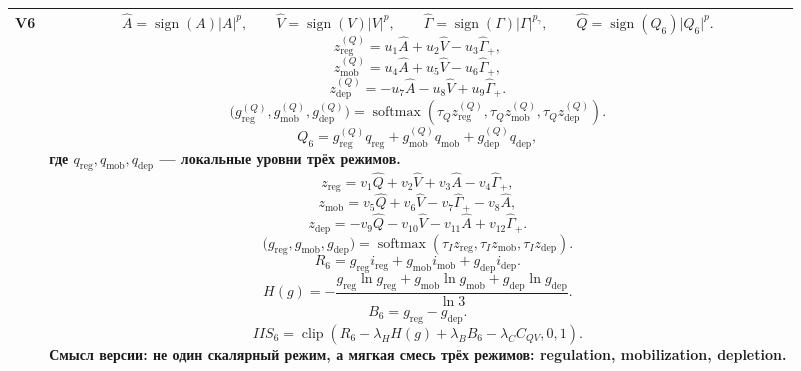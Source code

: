 \documentclass[12pt,a4paper]{article}
\newcommand{\sgn}{\operatorname{sign}}
\newcommand{\clip}{\operatorname{clip}}
\newcommand{\softmax}{\operatorname{softmax}}
\newcommand{\spow}[2]{\sgn(#1)\lvert #1 \rvert^{#2}}
\begin{document}
\begin{landscape}
\begin{longtable}{>{\raggedright\arraybackslash}p{1.6cm} >{\raggedright\arraybackslash}p{16.7cm}}
\textbf{V6} &
\[
\widehat{A}=\spow{A}{p}, \qquad
\widehat{V}=\spow{V}{p}, \qquad
\widehat{\Gamma}=\spow{\Gamma}{p_\gamma}, \qquad
\widehat{Q}=\spow{Q_6}{p}.
\]
\[
z^{(Q)}_{\mathrm{reg}}=u_1\widehat{A}+u_2\widehat{V}-u_3\widehat{\Gamma}_+,
\]
\[
z^{(Q)}_{\mathrm{mob}}=u_4\widehat{A}+u_5\widehat{V}-u_6\widehat{\Gamma}_+,
\]
\[
z^{(Q)}_{\mathrm{dep}}=-u_7\widehat{A}-u_8\widehat{V}+u_9\widehat{\Gamma}_+.
\]
\[
\bigl(g^{(Q)}_{\mathrm{reg}},g^{(Q)}_{\mathrm{mob}},g^{(Q)}_{\mathrm{dep}}\bigr)
=\softmax\!\left(\tau_Q z^{(Q)}_{\mathrm{reg}},\tau_Q z^{(Q)}_{\mathrm{mob}},\tau_Q z^{(Q)}_{\mathrm{dep}}\right).
\]
\[
Q_6=
g^{(Q)}_{\mathrm{reg}}q_{\mathrm{reg}}
+g^{(Q)}_{\mathrm{mob}}q_{\mathrm{mob}}
+g^{(Q)}_{\mathrm{dep}}q_{\mathrm{dep}},
\]
где \(q_{\mathrm{reg}}, q_{\mathrm{mob}}, q_{\mathrm{dep}}\) --- локальные уровни трёх режимов.
\[
z_{\mathrm{reg}}=v_1\widehat{Q}+v_2\widehat{V}+v_3\widehat{A}-v_4\widehat{\Gamma}_+,
\]
\[
z_{\mathrm{mob}}=v_5\widehat{Q}+v_6\widehat{V}-v_7\widehat{\Gamma}_+-v_8\widehat{A},
\]
\[
z_{\mathrm{dep}}=-v_9\widehat{Q}-v_{10}\widehat{V}-v_{11}\widehat{A}+v_{12}\widehat{\Gamma}_+.
\]
\[
\bigl(g_{\mathrm{reg}},g_{\mathrm{mob}},g_{\mathrm{dep}}\bigr)
=\softmax\!\left(\tau_I z_{\mathrm{reg}},\tau_I z_{\mathrm{mob}},\tau_I z_{\mathrm{dep}}\right).
\]
\[
R_6=g_{\mathrm{reg}}i_{\mathrm{reg}}+g_{\mathrm{mob}}i_{\mathrm{mob}}+g_{\mathrm{dep}}i_{\mathrm{dep}}.
\]
\[
H(g)=-
\frac{
g_{\mathrm{reg}}\ln g_{\mathrm{reg}}+
g_{\mathrm{mob}}\ln g_{\mathrm{mob}}+
g_{\mathrm{dep}}\ln g_{\mathrm{dep}}
}{\ln 3}.
\]
\[
B_6=g_{\mathrm{reg}}-g_{\mathrm{dep}}.
\]
\[
IIS_6=\clip\!\left(R_6-\lambda_H H(g)+\lambda_B B_6-\lambda_C C_{QV},0,1\right).
\]
Смысл версии: не один скалярный режим, а мягкая смесь трёх режимов: regulation, mobilization, depletion. \\

\bottomrule
\end{longtable}
\end{landscape}
\end{document}
